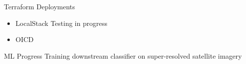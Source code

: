 \begin{frame}{Terraform Deployments}
    \begin{itemize}
        \item LocalStack Testing in progress
        \item OICD 
    \end{itemize}    
\end{frame}

\begin{frame}{ML Progress}
    Training downstream classifier on super-resolved satellite imagery
\end{frame}